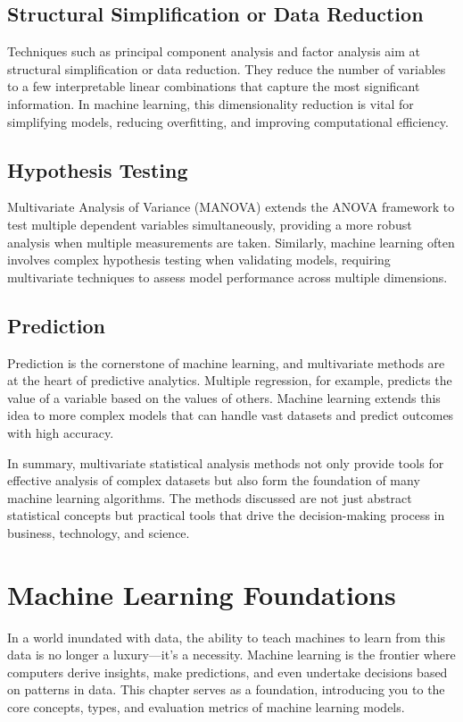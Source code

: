 \documentclass[a4paper,12pt]{book}
\newcounter{example}
\begin{document}
\section{Structural Simplification or Data Reduction}
Techniques such as principal component analysis and factor analysis aim at structural simplification or data reduction. They reduce the number of variables to a few interpretable linear combinations that capture the most significant information. In machine learning, this dimensionality reduction is vital for simplifying models, reducing overfitting, and improving computational efficiency.

\section{Hypothesis Testing}
Multivariate Analysis of Variance (MANOVA) extends the ANOVA framework to test multiple dependent variables simultaneously, providing a more robust analysis when multiple measurements are taken. Similarly, machine learning often involves complex hypothesis testing when validating models, requiring multivariate techniques to assess model performance across multiple dimensions.

\section{Prediction}
Prediction is the cornerstone of machine learning, and multivariate methods are at the heart of predictive analytics. Multiple regression, for example, predicts the value of a variable based on the values of others. Machine learning extends this idea to more complex models that can handle vast datasets and predict outcomes with high accuracy.

In summary, multivariate statistical analysis methods not only provide tools for effective analysis of complex datasets but also form the foundation of many machine learning algorithms. The methods discussed are not just abstract statistical concepts but practical tools that drive the decision-making process in business, technology, and science.


\chapter{Machine Learning Foundations}
In a world inundated with data, the ability to teach machines to learn from this data is no longer a luxury—it's a necessity. Machine learning is the frontier where computers derive insights, make predictions, and even undertake decisions based on patterns in data. This chapter serves as a foundation, introducing you to the core concepts, types, and evaluation metrics of machine learning models.
\end{document}
